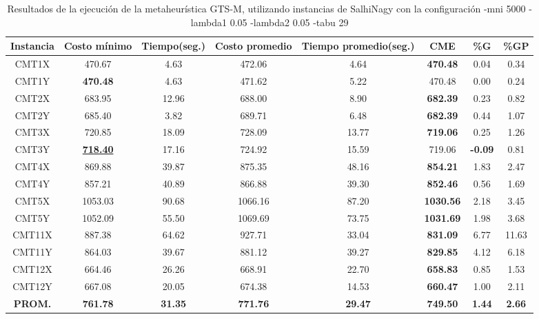 \begin{table}[h]
\caption{Resultados de la ejecución de la metaheurística GTS-M, utilizando instancias de SalhiNagy con la configuración -mni 5000 -lambda1 0.05 -lambda2 0.05 -tabu 29}
\centering
\small
\begin{tabular}{c c c c c c c c}
\hline\hline
Instancia & Costo mínimo & Tiempo(seg.) & Costo promedio & Tiempo promedio(seg.) & CME & \%G & \%GP \\ [0.5ex]
\hline
CMT1X & 470.67 & 4.63 & 
472.06 & 4.64 & \bf{470.48} & 
0.04 & 0.34\\CMT1Y & \bf{470.48} & 4.63 & 
471.62 & 5.22 & 470.48 & 0.00
 & 0.24\\CMT2X & 683.95 & 12.96 & 
688.00 & 8.90 & \bf{682.39} & 
0.23 & 0.82\\CMT2Y & 685.40 & 3.82 & 
689.71 & 6.48 & \bf{682.39} & 
0.44 & 1.07\\CMT3X & 720.85 & 18.09 & 
728.09 & 13.77 & \bf{719.06} & 
0.25 & 1.26\\CMT3Y & \bf{\underline{718.40}} & 17.16 & 
724.92 & 15.59 & 719.06 & 
\bf{-0.09} & 0.81\\CMT4X & 869.88 & 39.87 & 
875.35 & 48.16 & \bf{854.21} & 
1.83 & 2.47\\CMT4Y & 857.21 & 40.89 & 
866.88 & 39.30 & \bf{852.46} & 
0.56 & 1.69\\CMT5X & 1053.03 & 90.68 & 
1066.16 & 87.20 & \bf{1030.56} & 
2.18 & 3.45\\CMT5Y & 1052.09 & 55.50 & 
1069.69 & 73.75 & \bf{1031.69} & 
1.98 & 3.68\\CMT11X & 887.38 & 64.62 & 
927.71 & 33.04 & \bf{831.09} & 
6.77 & 11.63\\CMT11Y & 864.03 & 39.67 & 
881.12 & 39.27 & \bf{829.85} & 
4.12 & 6.18\\CMT12X & 664.46 & 26.26 & 
668.91 & 22.70 & \bf{658.83} & 
0.85 & 1.53\\CMT12Y & 667.08 & 20.05 & 
674.38 & 14.53 & \bf{660.47} & 
1.00 & 2.11\\\bf{PROM.} & 
\bf{761.78} & \bf{31.35} & \bf{771.76} & \bf{29.47} & \bf{749.50} & \bf{1.44} & \bf{2.66}\\[1ex]\hline
\end{tabular}
\label{table:nonlin}
\end{table}
